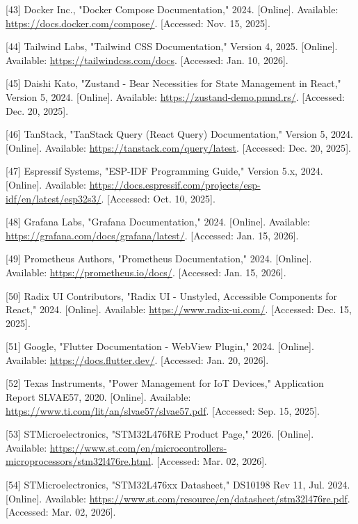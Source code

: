 \documentclass[a4paper]{extarticle}
\begin{document}
{[}43{]} Docker Inc., "Docker Compose Documentation," 2024.
{[}Online{]}. Available: \url{https://docs.docker.com/compose/}.
{[}Accessed: Nov. 15, 2025{]}.

{[}44{]} Tailwind Labs, "Tailwind CSS Documentation," Version 4, 2025.
{[}Online{]}. Available: \url{https://tailwindcss.com/docs}.
{[}Accessed: Jan. 10, 2026{]}.

{[}45{]} Daishi Kato, "Zustand - Bear Necessities for State Management
in React," Version 5, 2024. {[}Online{]}. Available:
\url{https://zustand-demo.pmnd.rs/}. {[}Accessed: Dec. 20, 2025{]}.

{[}46{]} TanStack, "TanStack Query (React Query) Documentation," Version
5, 2024. {[}Online{]}. Available:
\url{https://tanstack.com/query/latest}. {[}Accessed: Dec. 20, 2025{]}.

{[}47{]} Espressif Systems, "ESP-IDF Programming Guide," Version 5.x,
2024. {[}Online{]}. Available:
\url{https://docs.espressif.com/projects/esp-idf/en/latest/esp32s3/}.
{[}Accessed: Oct. 10, 2025{]}.

{[}48{]} Grafana Labs, "Grafana Documentation," 2024. {[}Online{]}.
Available: \url{https://grafana.com/docs/grafana/latest/}. {[}Accessed:
Jan. 15, 2026{]}.

{[}49{]} Prometheus Authors, "Prometheus Documentation," 2024.
{[}Online{]}. Available: \url{https://prometheus.io/docs/}. {[}Accessed:
Jan. 15, 2026{]}.

{[}50{]} Radix UI Contributors, "Radix UI - Unstyled, Accessible
Components for React," 2024. {[}Online{]}. Available:
\url{https://www.radix-ui.com/}. {[}Accessed: Dec. 15, 2025{]}.

{[}51{]} Google, "Flutter Documentation - WebView Plugin," 2024.
{[}Online{]}. Available: \url{https://docs.flutter.dev/}. {[}Accessed:
Jan. 20, 2026{]}.

{[}52{]} Texas Instruments, "Power Management for IoT Devices,"
Application Report SLVAE57, 2020. {[}Online{]}. Available:
\url{https://www.ti.com/lit/an/slvae57/slvae57.pdf}. {[}Accessed: Sep.
15, 2025{]}.

{[}53{]} STMicroelectronics, "STM32L476RE Product Page," 2026.
{[}Online{]}. Available:
\url{https://www.st.com/en/microcontrollers-microprocessors/stm32l476re.html}.
{[}Accessed: Mar. 02, 2026{]}.

{[}54{]} STMicroelectronics, "STM32L476xx Datasheet," DS10198 Rev 11,
Jul. 2024. {[}Online{]}. Available:
\url{https://www.st.com/resource/en/datasheet/stm32l476re.pdf}.
{[}Accessed: Mar. 02, 2026{]}.
\end{document}

